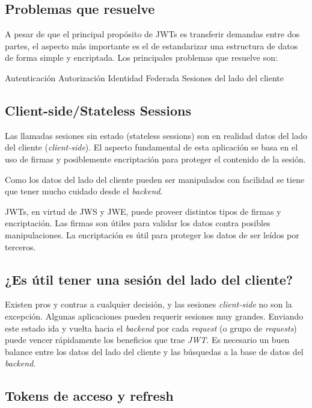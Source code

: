 \subsection[Problemas que resuelve]{Problemas que resuelve}

A pesar de que el principal propósito de JWTs es transferir demandas entre dos partes, el aspecto más importante es el de estandarizar una estructura de datos de forma simple y encriptada. 
Los principales problemas que resuelve son:
\begin{outline}
\2 Autenticación
\2 Autorización
\2 Identidad Federada
\2 Sesiones del lado del cliente
\end{outline}

\subsection[Client-side/Stateless Sessions]{Client-side/Stateless Sessions}

Las llamadas sesiones sin estado (stateless sessions) son en realidad datos del lado del cliente (\textit{client-side}). El aspecto fundamental de esta aplicación se basa en el uso de firmas y posiblemente encriptación para proteger el contenido de la sesión. 

Como los datos del lado del cliente pueden ser manipulados con facilidad se tiene que tener mucho cuidado desde el \textit{backend}.

JWTs, en virtud de JWS y JWE, puede proveer distintos tipos de firmas y encriptación. Las firmas son útiles para validar los datos contra posibles manipulaciones. La encriptación es útil para proteger los datos de ser leídos por terceros.

\subsection[¿Es útil tener una sesión del lado del cliente?]{¿Es útil tener una sesión del lado del cliente?}

Existen pros y contras a cualquier decisión, y las sesiones \textit{client-side} no son la excepción. Algunas aplicaciones pueden requerir sesiones muy grandes. Enviando este estado ida y vuelta hacia el \textit{backend} por cada \textit{request} (o grupo de \textit{requests}) puede vencer rápidamente los beneficios que trae \textit{JWT}. Es necesario un buen balance entre los datos del lado del cliente y las búsquedas a la base de datos del \textit{backend}.

\subsection[Tokens de acceso y refresh]{Tokens de acceso y refresh}

